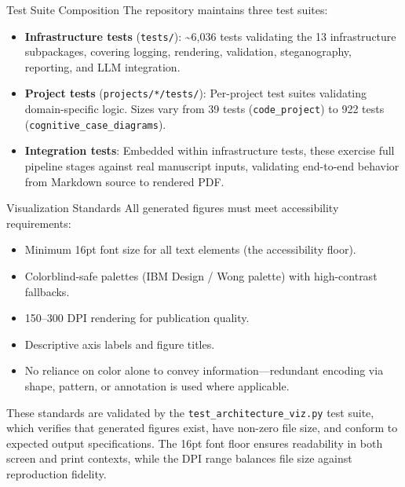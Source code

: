 \documentclass[
  ignorenonframetext,
]{beamer}
\providecommand{\tightlist}{%
  \setlength{\itemsep}{0pt}\setlength{\parskip}{0pt}}
\begin{document}
\begin{frame}[fragile]{Test Suite Composition}
\protect{}\label{test-suite-composition}
The repository maintains three test suites:

\begin{itemize}
\tightlist
\item
  \textbf{Infrastructure tests} (\texttt{tests/}): \textasciitilde6,036
  tests validating the 13 infrastructure subpackages, covering logging,
  rendering, validation, steganography, reporting, and LLM integration.
\item
  \textbf{Project tests} (\texttt{projects/*/tests/}): Per-project test
  suites validating domain-specific logic. Sizes vary from 39 tests
  (\texttt{code\_project}) to 922 tests
  (\texttt{cognitive\_case\_diagrams}).
\item
  \textbf{Integration tests}: Embedded within infrastructure tests,
  these exercise full pipeline stages against real manuscript inputs,
  validating end-to-end behavior from Markdown source to rendered PDF.
\end{itemize}
\end{frame}

\begin{frame}[fragile]{Visualization Standards}
\protect{}\label{visualization-standards}
All generated figures must meet accessibility requirements:

\begin{itemize}
\tightlist
\item
  Minimum 16pt font size for all text elements (the accessibility
  floor).
\item
  Colorblind-safe palettes (IBM Design / Wong palette) with
  high-contrast fallbacks.
\item
  150--300 DPI rendering for publication quality.
\item
  Descriptive axis labels and figure titles.
\item
  No reliance on color alone to convey information---redundant encoding
  via shape, pattern, or annotation is used where applicable.
\end{itemize}

These standards are validated by the \texttt{test\_architecture\_viz.py}
test suite, which verifies that generated figures exist, have non-zero
file size, and conform to expected output specifications. The 16pt font
floor ensures readability in both screen and print contexts, while the
DPI range balances file size against reproduction fidelity.
\end{frame}
\end{document}

